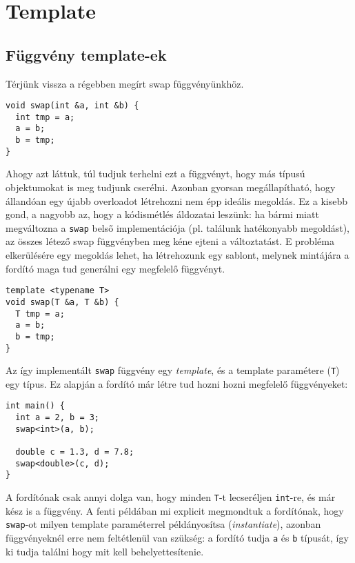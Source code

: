 \documentclass[../cpp_book/cpp_book.tex]{subfiles}
\begin{document}
	\section{Template}
	\subsection{Függvény template-ek}
	Térjünk vissza a régebben megírt swap függvényünkhöz.
	\begin{lstlisting}
void swap(int &a, int &b) {
  int tmp = a;
  a = b;
  b = tmp;
}
	\end{lstlisting}
	Ahogy azt láttuk, túl tudjuk terhelni ezt a függvényt, hogy más típusú objektumokat is meg tudjunk cserélni.
	Azonban gyorsan megállapítható, hogy állandóan egy újabb overloadot létrehozni nem épp ideális megoldás. Ez a kisebb gond, a nagyobb az, hogy a kódismétlés áldozatai leszünk: ha bármi miatt megváltozna a \texttt{swap} belső implementációja (pl. találunk hatékonyabb megoldást), az összes létező swap függvényben meg kéne ejteni a változtatást. E probléma elkerülésére egy megoldás lehet, ha létrehozunk egy sablont, melynek mintájára a fordító maga tud generálni egy megfelelő függvényt.
	\begin{lstlisting}
template <typename T>
void swap(T &a, T &b) {
  T tmp = a;
  a = b;
  b = tmp;
}
	\end{lstlisting}
	Az így implementált \texttt{swap} függvény egy \textit{template}, és a template paramétere (\texttt{T}) egy típus. Ez alapján a fordító már létre tud hozni hozni megfelelő függvényeket:
	\begin{lstlisting}
int main() {
  int a = 2, b = 3;
  swap<int>(a, b);

  double c = 1.3, d = 7.8;
  swap<double>(c, d);
}
	\end{lstlisting}
	A fordítónak csak annyi dolga van, hogy minden \texttt{T}-t lecseréljen \texttt{int}-re, és már kész is a függvény. A fenti példában mi explicit megmondtuk a fordítónak, hogy \texttt{swap}-ot milyen template paraméterrel {példányosítsa} (\textit{instantiate}), azonban függvényeknél erre nem feltétlenül van szükség: a fordító tudja \texttt{a} és \texttt{b} típusát, így ki tudja találni hogy mit kell behelyettesítenie.
\end{document}
